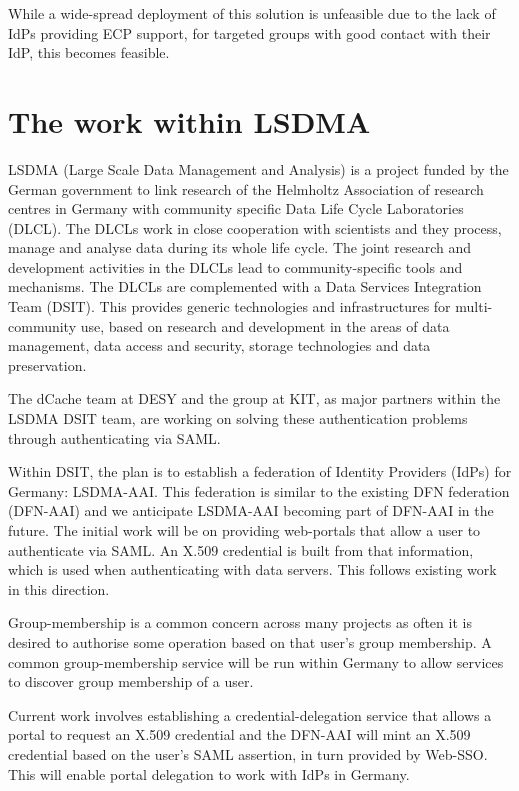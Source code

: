 \documentclass[a4paper]{jpconf}
\begin{document}
While a wide-spread deployment of this solution is unfeasible due to
the lack of IdPs providing ECP support, for targeted groups with good
contact with their IdP, this becomes feasible.


\section{The work within LSDMA}

LSDMA\cite{lsdma} (Large Scale Data Management and Analysis) is a
project funded by the German government to link research of the
Helmholtz Association of research centres in Germany with community
specific Data Life Cycle Laboratories (DLCL). The DLCLs work in close
cooperation with scientists and they process, manage and analyse data
during its whole life cycle. The joint research and development
activities in the DLCLs lead to community-specific tools and
mechanisms. The DLCLs are complemented with a Data Services
Integration Team (DSIT). This provides generic technologies and
infrastructures for multi-community use, based on research and
development in the areas of data management, data access and security,
storage technologies and data preservation.

The dCache team at DESY and the group at KIT, as major partners within
the LSDMA DSIT team, are working on solving these authentication
problems through authenticating via SAML.

Within DSIT, the plan is to establish a federation of Identity
Providers (IdPs) for Germany: LSDMA-AAI.  This federation is similar
to the existing DFN federation (DFN-AAI)\cite{dfn-aai-website} and we
anticipate LSDMA-AAI becoming part of DFN-AAI in the future.  The
initial work will be on providing web-portals that allow a user to
authenticate via SAML.  An X.509 credential is built from that
information, which is used when authenticating with data servers.
This follows existing work in this
direction\cite{groeper2007architecture}.

Group-membership is a common concern across many projects as often it
is desired to authorise some operation based on that user's group
membership.  A common group-membership service will be run within
Germany to allow services to discover group membership of a user.

Current work involves establishing a credential-delegation service
that allows a portal to request an X.509 credential and the DFN-AAI
will mint an X.509 credential based on the user's SAML assertion, in
turn provided by Web-SSO.  This will enable portal delegation to work
with IdPs in Germany.
\end{document}
